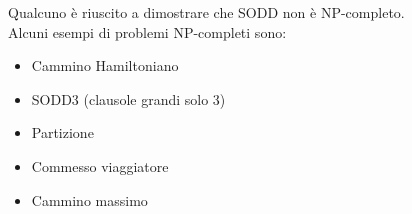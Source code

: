 \noindent Qualcuno è riuscito a dimostrare che SODD non è NP-completo.\\
Alcuni esempi di problemi NP-completi sono:
\begin{itemize}
    \item Cammino Hamiltoniano
    \item SODD3 (clausole grandi solo 3)
    \item Partizione
    \item Commesso viaggiatore
    \item Cammino massimo
\end{itemize}
\clearpage
